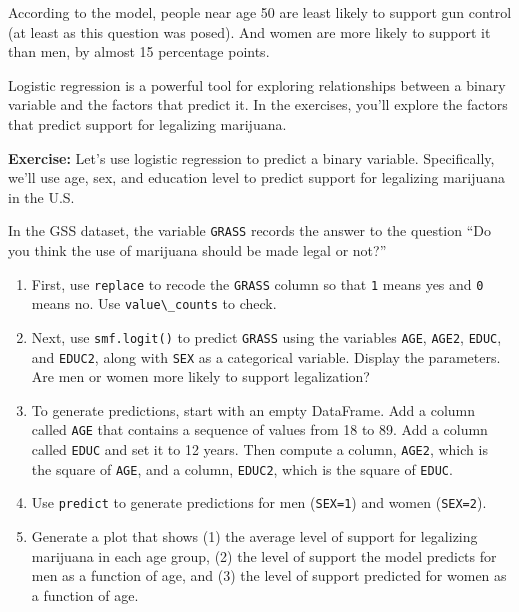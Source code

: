 According to the model, people near age 50 are least likely to support
gun control (at least as this question was posed). And women are more
likely to support it than men, by almost 15 percentage points.

Logistic regression is a powerful tool for exploring relationships
between a binary variable and the factors that predict it. In the
exercises, you'll explore the factors that predict support for
legalizing marijuana.

\textbf{Exercise:} Let's use logistic regression to predict a binary
variable. Specifically, we'll use age, sex, and education level to
predict support for legalizing marijuana in the U.S.

In the GSS dataset, the variable \passthrough{\lstinline!GRASS!} records
the answer to the question ``Do you think the use of marijuana should be
made legal or not?''

\begin{enumerate}
\def\labelenumi{\arabic{enumi}.}
\item
  First, use \passthrough{\lstinline!replace!} to recode the
  \passthrough{\lstinline!GRASS!} column so that
  \passthrough{\lstinline!1!} means yes and \passthrough{\lstinline!0!}
  means no. Use \passthrough{\lstinline!value\_counts!} to check.
\item
  Next, use \passthrough{\lstinline!smf.logit()!} to predict
  \passthrough{\lstinline!GRASS!} using the variables
  \passthrough{\lstinline!AGE!}, \passthrough{\lstinline!AGE2!},
  \passthrough{\lstinline!EDUC!}, and \passthrough{\lstinline!EDUC2!},
  along with \passthrough{\lstinline!SEX!} as a categorical variable.
  Display the parameters. Are men or women more likely to support
  legalization?
\item
  To generate predictions, start with an empty DataFrame. Add a column
  called \passthrough{\lstinline!AGE!} that contains a sequence of
  values from 18 to 89. Add a column called
  \passthrough{\lstinline!EDUC!} and set it to 12 years. Then compute a
  column, \passthrough{\lstinline!AGE2!}, which is the square of
  \passthrough{\lstinline!AGE!}, and a column,
  \passthrough{\lstinline!EDUC2!}, which is the square of
  \passthrough{\lstinline!EDUC!}.
\item
  Use \passthrough{\lstinline!predict!} to generate predictions for men
  (\passthrough{\lstinline!SEX=1!}) and women
  (\passthrough{\lstinline!SEX=2!}).
\item
  Generate a plot that shows (1) the average level of support for
  legalizing marijuana in each age group, (2) the level of support the
  model predicts for men as a function of age, and (3) the level of
  support predicted for women as a function of age.
\end{enumerate}

